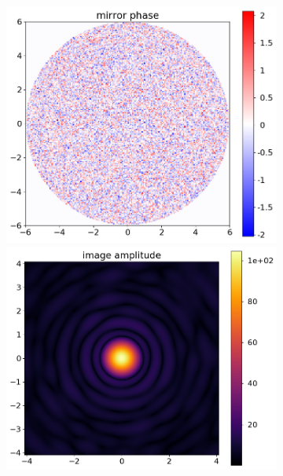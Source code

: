 \documentclass{article}
\begin{document}
\begin{figure}
    \centering
    \begin{subfigure}{0.5\textwidth}
        \begin{minipage}{0.5\textwidth}
            \centering
            \includegraphics[width=\textwidth]{pictures/error_pics/errors0in_phase.png}
        \end{minipage}%
        \hfill
        \begin{minipage}{0.5\textwidth}
            \centering
            \includegraphics[width=\textwidth]{pictures/error_pics/errors0out_abs.png}

\end{minipage}
\end{subfigure}
\end{figure}
\end{document}
